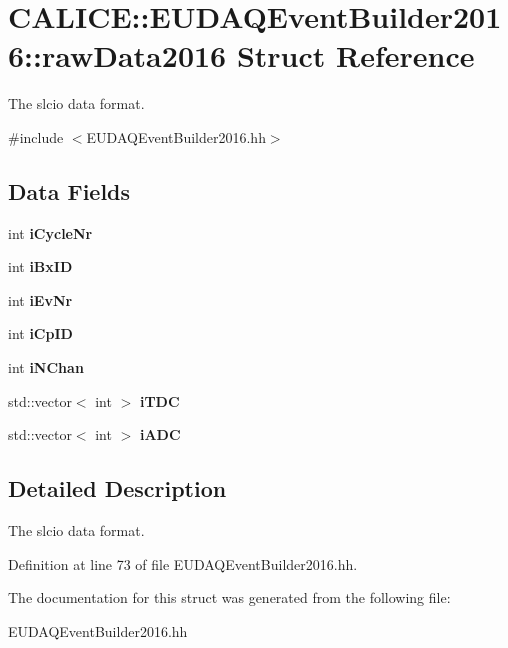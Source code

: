 \section{C\-A\-L\-I\-C\-E\-:\-:E\-U\-D\-A\-Q\-Event\-Builder2016\-:\-:raw\-Data2016 Struct Reference}
\label{structCALICE_1_1EUDAQEventBuilder2016_1_1rawData2016}


The slcio data format.  




{\ttfamily \#include $<$E\-U\-D\-A\-Q\-Event\-Builder2016.\-hh$>$}

\subsection*{Data Fields}
\begin{DoxyCompactItemize}
\item 
int {\bfseries i\-Cycle\-Nr}\label{structCALICE_1_1EUDAQEventBuilder2016_1_1rawData2016_a2a12b84f194650f0cb86bb5f15f87c50}

\item 
int {\bfseries i\-Bx\-I\-D}\label{structCALICE_1_1EUDAQEventBuilder2016_1_1rawData2016_a3ebe2cb51eabf615983343352119c26f}

\item 
int {\bfseries i\-Ev\-Nr}\label{structCALICE_1_1EUDAQEventBuilder2016_1_1rawData2016_a1722a96bd73d75a9f3ceb898e978025b}

\item 
int {\bfseries i\-Cp\-I\-D}\label{structCALICE_1_1EUDAQEventBuilder2016_1_1rawData2016_af178ec2c30a46ba3919c906861a62c94}

\item 
int {\bfseries i\-N\-Chan}\label{structCALICE_1_1EUDAQEventBuilder2016_1_1rawData2016_ad405c2fa24fbb237cca29e60c3d00fe1}

\item 
std\-::vector$<$ int $>$ {\bfseries i\-T\-D\-C}\label{structCALICE_1_1EUDAQEventBuilder2016_1_1rawData2016_abf229e6f172b15bb1e52bbeef2c2fe48}

\item 
std\-::vector$<$ int $>$ {\bfseries i\-A\-D\-C}\label{structCALICE_1_1EUDAQEventBuilder2016_1_1rawData2016_ae819b022d65475e10454ee71238dddba}

\end{DoxyCompactItemize}


\subsection{Detailed Description}
The slcio data format. 

Definition at line 73 of file E\-U\-D\-A\-Q\-Event\-Builder2016.\-hh.



The documentation for this struct was generated from the following file\-:\begin{DoxyCompactItemize}
\item 
E\-U\-D\-A\-Q\-Event\-Builder2016.\-hh\end{DoxyCompactItemize}
